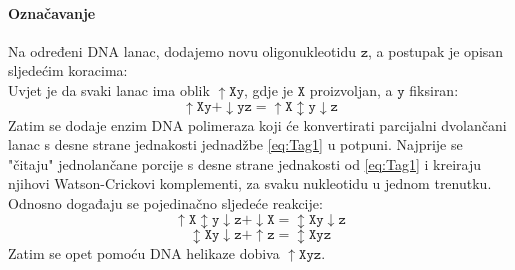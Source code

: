 \documentclass[a4paper,oneside,12pt]{memoir} %
\begin{document}
\begin{spacing}{1.5}
\paragraph{Označavanje} Na određeni DNA lanac, dodajemo novu oligonukleotidu $\mathtt{z}$, a postupak je opisan sljedećim koracima:\\
Uvjet je da svaki lanac ima oblik $\mathtt{\uparrow Xy}$, gdje je $\mathtt{X}$ proizvoljan, a $\mathtt{y}$ fiksiran:
\begin{equation}
\label{eq:Tag1}
\mathtt{\uparrow Xy + \downarrow yz=\uparrow X \updownarrow y \downarrow z}
\end{equation}
Zatim se dodaje enzim DNA polimeraza koji će konvertirati parcijalni dvolančani lanac s desne strane jednakosti jednadžbe \ref{eq:Tag1} u potpuni. Najprije se "čitaju" jednolančane porcije s desne strane jednakosti od \ref{eq:Tag1} i kreiraju njihovi Watson-Crickovi komplementi, za svaku nukleotidu u jednom trenutku. Odnosno događaju se pojedinačno sljedeće reakcije:
\begin{equation}
\label{eq:Tag2}
\mathtt{\uparrow X \updownarrow y \downarrow z + \downarrow X = \updownarrow Xy \downarrow z}
\end{equation}
\begin{equation}
\label{eq:Tag3}
\mathtt{\updownarrow Xy \downarrow z + \uparrow z = \updownarrow Xyz}
\end{equation}
Zatim se opet pomoću DNA helikaze dobiva $\mathtt{\uparrow Xyz}$.


\end{spacing}
\end{document}
